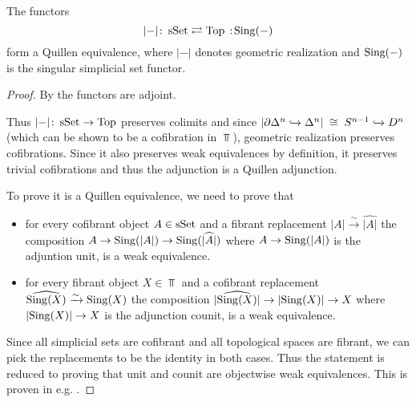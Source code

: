 \begin{prop}\label{prop:quillenEqSSetTop}
    The functors
    \begin{equation*}
        \lvert-\rvert\colon\sSet\rightleftarrows\Top\mkern+3mu:\mkern-3mu\Sing(-)
    \end{equation*}
    form a Quillen equivalence, where $\lvert-\rvert$ denotes geometric realization and $\operatorname{Sing}(-)$ is the singular simplicial set functor.
    \begin{proof}
        By \cite[Corollary 1.1.8.5]{kerodon} the functors are adjoint.

        Thus $\lvert-\rvert\colon\operatorname{sSet}\to\operatorname{Top}$ preserves colimits and since $\lvert\partial\Delta^n\xhookrightarrow{}\Delta^n\rvert\;\cong\;S^{n-1}\xhookrightarrow{} D^n$ (which can be shown to be a cofibration in $\Top$), geometric realization preserves cofibrations.
        Since it also preserves weak equivalences by definition, it preserves trivial cofibrations and thus the adjunction is a Quillen adjunction.

        To prove it is a Quillen equivalence, we need to prove that 
        \begin{itemize}
            \item for every cofibrant object $A\in\operatorname{sSet}$ and a fibrant replacement $\lvert A\rvert\xrightarrow{\sim}\widehat{\lvert A\rvert}$ the composition $A\to\operatorname{Sing}(\lvert A\rvert)\to\operatorname{Sing}(\widehat{\lvert A\rvert})$ where $A\to\operatorname{Sing}(\lvert A\rvert)$ is the adjuntion unit, is a weak equivalence.
            \item for every fibrant object $X\in\Top$ and a cofibrant replacement $\widehat{\operatorname{Sing}(X)}\xrightarrow{\sim}\operatorname{Sing}(X)$ the composition $\lvert\widehat{\operatorname{Sing}(X)}\rvert\to\lvert\operatorname{Sing}(X)\rvert\to X$ where $\lvert\operatorname{Sing}(X)\rvert\to X$ is the adjunction counit, is a weak equivalence.
        \end{itemize}
        Since all simplicial sets are cofibrant and all topological spaces are fibrant, we can pick the replacements to be the identity in both cases.
        Thus the statement is reduced to proving that unit and counit are objectwise weak equivalences. 
        This is proven in e.g. \cite[Theorem 3.5.4.1 and Corollary 3.5.4.2]{kerodon}.
    \end{proof}
\end{prop}
